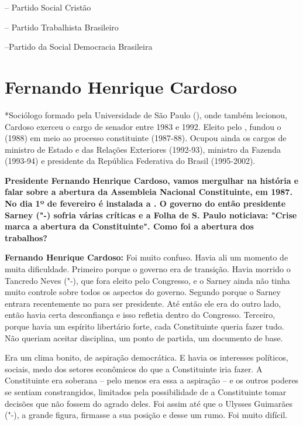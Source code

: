  -- Partido Social Cristão

 -- Partido Trabalhista Brasileiro

 --Partido da Social Democracia Brasileira


\chapter{Fernando Henrique Cardoso}

*Sociólogo formado pela Universidade de São Paulo (), onde também
lecionou, Cardoso exerceu o cargo de senador entre 1983 e 1992. Eleito
pelo , fundou o  (1988) em meio ao processo constituinte
(1987-88). Ocupou ainda os cargos de ministro de Estado e das Relações
Exteriores (1992-93), ministro da Fazenda (1993-94) e presidente da
República Federativa do Brasil (1995-2002).

\textbf{Presidente Fernando Henrique Cardoso, vamos mergulhar na
história e falar sobre a abertura da Assembleia Nacional Constituinte,
em 1987. No dia 1º de fevereiro é instalada a . O governo do então
presidente Sarney ("-) sofria várias críticas e a Folha de S. Paulo
noticiava: "Crise marca a abertura da Constituinte". Como foi a abertura
dos trabalhos?}

\textbf{Fernando Henrique Cardoso:} Foi muito confuso. Havia ali um
momento de muita dificuldade. Primeiro porque o governo era de
transição. Havia morrido o Tancredo Neves ("-), que fora eleito
pelo Congresso, e o Sarney ainda não tinha muito controle sobre todos os
aspectos do governo. Segundo porque o Sarney entrara recentemente no
 para ser presidente. Até então ele era do outro lado, então havia
certa desconfiança e isso refletia dentro do Congresso. Terceiro, porque
havia um espírito libertário forte, cada Constituinte queria fazer tudo.
Não queriam aceitar disciplina, um ponto de partida, um documento de
base.

Era um clima bonito, de aspiração democrática. E havia os interesses
políticos, sociais, medo dos setores econômicos do que a Constituinte
iria fazer. A Constituinte era soberana -- pelo menos era essa a
aspiração -- e os outros poderes se sentiam constrangidos, limitados
pela possibilidade de a Constituinte tomar decisões que não fossem do
agrado deles. Foi assim até que o Ulysses Guimarães ("-), a grande
figura, firmasse a sua posição e desse um rumo. Foi muito difícil.


